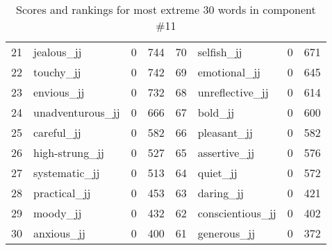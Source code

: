 \begin{table}[tbp]
\begin{tabular}{| rlr@{.}l | rlr@{.}l |}
    21 & jealous\_jj & 0 & 744    &    70 & selfish\_jj & 0 & 671 \\
    22 & touchy\_jj & 0 & 742    &    69 & emotional\_jj & 0 & 645 \\
    23 & envious\_jj & 0 & 732    &    68 & unreflective\_jj & 0 & 614 \\
    24 & unadventurous\_jj & 0 & 666    &    67 & bold\_jj & 0 & 600 \\
    25 & careful\_jj & 0 & 582    &    66 & pleasant\_jj & 0 & 582 \\
    26 & high-strung\_jj & 0 & 527    &    65 & assertive\_jj & 0 & 576 \\
    27 & systematic\_jj & 0 & 513    &    64 & quiet\_jj & 0 & 572 \\
    28 & practical\_jj & 0 & 453    &    63 & daring\_jj & 0 & 421 \\
    29 & moody\_jj & 0 & 432    &    62 & conscientious\_jj & 0 & 402 \\
    30 & anxious\_jj & 0 & 400    &    61 & generous\_jj & 0 & 372 \\
    \hline
    \end{tabular}
    \caption{Scores and rankings for most extreme 30 words in component \#11} 
\end{table}
\clearpage
